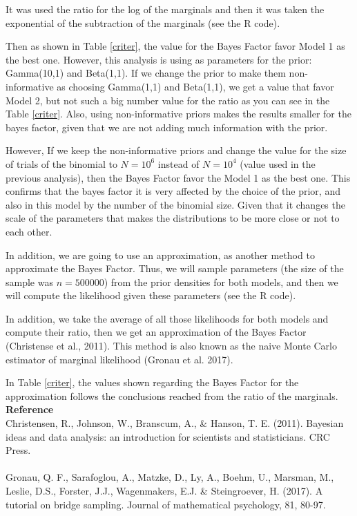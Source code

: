 \documentclass[a4paper, 11pt]{article}
\begin{document}
It was used the ratio for the log of the marginals and then it was taken the exponential of the subtraction of the marginals (see the R code).

Then as shown in Table \ref{criter}, the value for the Bayes Factor favor Model 1 as the best one. However, this analysis is using as parameters for the prior: Gamma(10,1) and Beta(1,1). If we change the prior to make them non-informative as choosing Gamma(1,1) and Beta(1,1), we get a value that favor Model 2, but not such a big number value for the ratio as you can see in the Table \ref{criter}. Also, using non-informative priors makes the results smaller for the bayes factor, given that we are not adding much information with the prior.

However, If we keep the non-informative priors and change the value for the size of trials of the binomial to $N=10^6$ instead of $N=10^4$ (value used in the previous analysis), then the Bayes Factor favor the Model 1 as the best one. This confirms that the bayes factor it is very affected by the choice of the prior, and also in this model by the number of the binomial size. Given that it changes the scale of the parameters that makes the distributions to be more close or not to each other.

In addition, we are going to use an approximation, as another method to approximate the Bayes Factor. Thus, we will sample parameters (the size of the sample was $n=500000$) from the prior densities for both models, and then we will compute the likelihood given these parameters (see the R code).

In addition, we take the average of all those likelihoods for both models and compute their ratio, then we get an approximation of the Bayes Factor (Christense et al., 2011). This method is also known as the naive Monte Carlo estimator of marginal likelihood (Gronau et al. 2017). 

In Table \ref{criter}, the values shown regarding the Bayes Factor for the approximation follows the conclusions reached from the ratio of the marginals. \\


\noindent
\textbf{Reference} \\
 Christensen, R., Johnson, W., Branscum, A., \& Hanson, T. E. (2011). Bayesian ideas and data analysis: an introduction for scientists and statisticians. CRC Press. \\ \\
\noindent
 Gronau, Q. F., Sarafoglou, A., Matzke, D., Ly, A., Boehm, U., Marsman, M.,  Leslie, D.S., Forster, J.J., Wagenmakers, E.J. \& Steingroever, H. (2017). A tutorial on bridge sampling. Journal of mathematical psychology, 81, 80-97.
 
\end{document}
